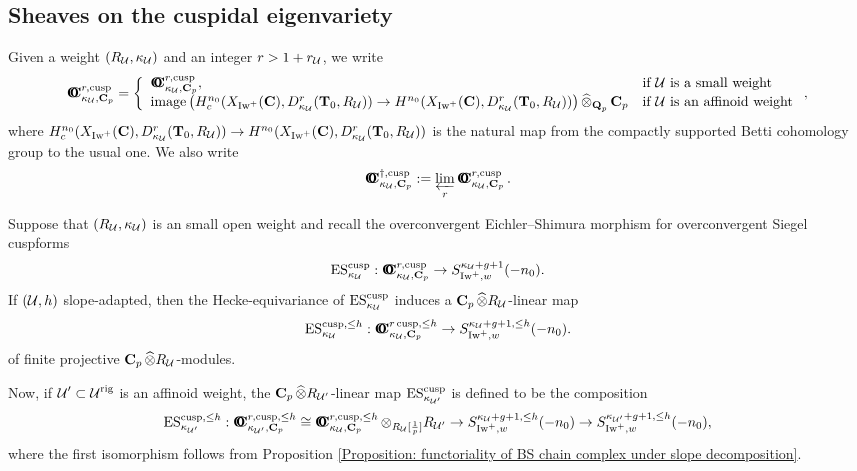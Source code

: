 \subsection{Sheaves on the cuspidal eigenvariety}\label{subsection: sheaves on the cuspidal eigenvariety}

Given a weight $(R_{\operatorname{\mathcal{U}}}, \kappa_{\operatorname{\mathcal{U}}})$ and an integer $r>1+r_{\operatorname{\mathcal{U}}}$, we write \[
    \OC_{\kappa_{\calU}, \C_p}^{r, \cusp} = \left\{\begin{array}{ll}
        \OC_{\kappa_{\calU}, \C_p}^{r, \cusp}, & \text{if $\calU$ is a small weight} \\
        \image\left( H_{c}^{n_0}(X_{\Iw^+}(\C), D_{\kappa_{\calU}}^{r}(\T_0, R_{\calU}))\rightarrow H^{n_0}(X_{\Iw^+}(\C), D_{\kappa_{\calU}}^{r}(\T_0, R_{\calU}))\right)\widehat{\otimes}_{\Q_p} \C_p & \text{if $\calU$ is an affinoid weight}
    \end{array}\right.,
\] where $H_{c}^{n_0}(X_{\operatorname{Iw}^+}(\operatorname{\mathbf{C}}), D_{\kappa_{\operatorname{\mathcal{U}}}}^{r}(\operatorname{\mathbf{T}}_0, R_{\operatorname{\mathcal{U}}}))\rightarrow H^{n_0}(X_{\operatorname{Iw}^+}(\operatorname{\mathbf{C}}), D_{\kappa_{\operatorname{\mathcal{U}}}}^{r}(\operatorname{\mathbf{T}}_0, R_{\operatorname{\mathcal{U}}}))$ is the natural map from the compactly supported Betti cohomology group to the usual one. We also write \[
    \OC_{\kappa_{\calU}, \C_p}^{\dagger, \cusp} := \varprojlim_{r} \OC_{\kappa_{\calU}, \C_p}^{r, \cusp}.
\]

Suppose that $(R_{\operatorname{\mathcal{U}}}, \kappa_{\operatorname{\mathcal{U}}})$ is an small open weight and recall the overconvergent Eichler--Shimura morphism for overconvergent Siegel cuspforms \[
    \operatorname{ES}_{\kappa_{\operatorname{\mathcal{U}}}}^{\operatorname{cusp}}: \operatorname{\mathbf{O}\!\!\!\!\mathbf{C}}_{\kappa_{\operatorname{\mathcal{U}}}, \operatorname{\mathbf{C}}_p}^{r, \operatorname{cusp}} \rightarrow S_{\operatorname{Iw}^+, w}^{\kappa_{\operatorname{\mathcal{U}}}+g+1}(-n_0).
\] If $(\operatorname{\mathcal{U}}, h)$ slope-adapted, then the Hecke-equivariance of $\operatorname{ES}_{\kappa_{\operatorname{\mathcal{U}}}}^{\operatorname{cusp}}$ induces a $\operatorname{\mathbf{C}}_p\widehat{\otimes}R_{\operatorname{\mathcal{U}}}$-linear map \[
   \operatorname{ES}_{\kappa_{\operatorname{\mathcal{U}}}}^{\operatorname{cusp}, \leq h}: \operatorname{\mathbf{O}\!\!\!\!\mathbf{C}}_{\kappa_{\operatorname{\mathcal{U}}}, \operatorname{\mathbf{C}}_p}^{r \operatorname{cusp}, \leq h}\rightarrow S_{\operatorname{Iw}^+, w}^{\kappa_{\operatorname{\mathcal{U}}}+g+1,\leq h}(-n_0). 
\] of finite projective $\operatorname{\mathbf{C}}_p\widehat{\otimes}R_{\operatorname{\mathcal{U}}}$-modules. 

Now, if $\operatorname{\mathcal{U}}'\subset \operatorname{\mathcal{U}}^{\operatorname{rig}}$ is an affinoid weight, the $\operatorname{\mathbf{C}}_p\widehat{\otimes}R_{\operatorname{\mathcal{U}}'}$-linear map $\operatorname{ES}_{\kappa_{\operatorname{\mathcal{U}}'}}^{\operatorname{cusp}}$ is defined to be the composition \begin{equation}\label{eq: ES for affinoid weights}
    \ES_{\kappa_{\calU'}}^{\cusp, \leq h}: \OC_{\kappa_{\calU'}, \C_p}^{r, \cusp, \leq h} \cong \OC_{\kappa_{\calU}, \C_p}^{r, \cusp, \leq h}\otimes_{R_{\calU}[\frac{1}{p}]}R_{\calU'} \rightarrow S_{\Iw^+, w}^{\kappa_{\calU}+g+1, \leq h}(-n_0) \rightarrow S_{\Iw^+, w}^{\kappa_{\calU'}+g+1, \leq h}(-n_0),
\end{equation} where the first isomorphism follows from Proposition \ref{Proposition: functoriality of BS chain complex under slope decomposition}. 


